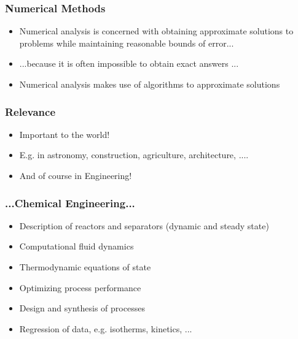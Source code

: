 \documentclass[11pt,table,final,fleqn,xcolor={usenames,dvipsnames},handout]{beamer}
\begin{document}
\begin{frame}
 \frametitle{Numerical Methods}
 \begin{itemize}
  \item Numerical analysis is concerned with obtaining approximate solutions to problems while maintaining reasonable bounds of error...
  \item ...because it is often impossible to obtain exact answers ...
  \item Numerical analysis makes use of algorithms to
approximate solutions
 \end{itemize}
\end{frame}

\begin{frame}
 \frametitle{Relevance}
  \begin{itemize}
  \item Important to the world!
  \item E.g. in astronomy, construction, agriculture, architecture, ....
  \item And of course in Engineering!
 \end{itemize}
\end{frame}

\begin{frame}
 \frametitle{...Chemical Engineering...}
  \begin{itemize}
	  \item Description of reactors and separators (dynamic and steady state)
		\item Computational fluid dynamics
		\item Thermodynamic equations of state
		\item Optimizing process performance
		\item Design and synthesis of processes
		\item Regression of data, e.g. isotherms, kinetics, ...
 \end{itemize}
\end{frame}
\end{document}
